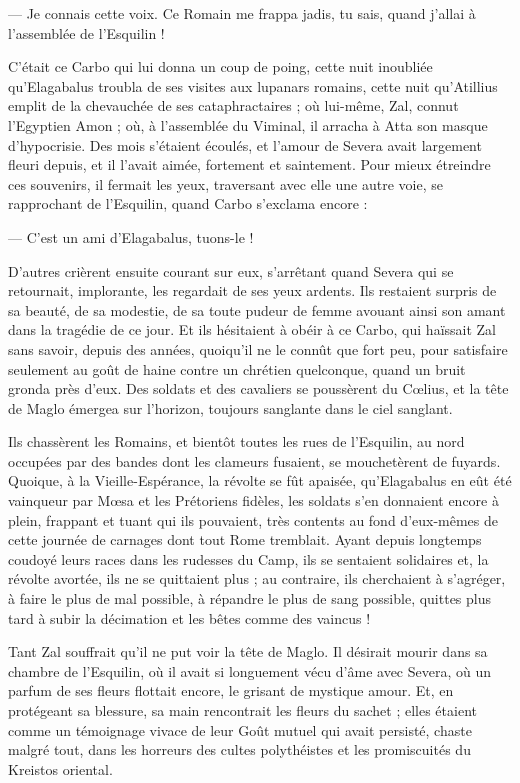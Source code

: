 \documentclass[a4paper, 11pt, oneside, polutonikogreek, french]{article}
\begin{document}
--- Je connais cette voix. Ce Romain me frappa jadis, tu sais, quand j'allai à l'assemblée de l'Esquilin !

C'était ce Carbo qui lui donna un coup de poing, cette nuit inoubliée qu'Elagabalus troubla de ses visites aux lupanars romains, cette nuit qu'Atillius emplit de la chevauchée de ses cataphractaires ; où lui-même, Zal, connut l'Egyptien Amon ; où, à l'assemblée du Viminal, il arracha à Atta son masque d'hypocrisie. Des mois s'étaient écoulés, et l'amour de Severa avait largement fleuri depuis, et il l'avait aimée, fortement et saintement. Pour mieux étreindre ces souvenirs, il fermait les yeux, traversant avec elle une autre voie, se rapprochant de l'Esquilin, quand Carbo s'exclama encore :

--- C'est un ami d'Elagabalus, tuons-le !

D'autres crièrent ensuite courant sur eux, s'arrêtant quand Severa qui se retournait, implorante, les regardait de ses yeux ardents. Ils restaient surpris de sa beauté, de sa modestie, de sa toute pudeur de femme avouant ainsi son amant dans la tragédie de ce jour. Et ils hésitaient à obéir à ce Carbo, qui haïssait Zal sans savoir, depuis des années, quoiqu'il ne le connût que fort peu, pour satisfaire seulement au goût de haine contre un chrétien quelconque, quand un bruit gronda près d'eux. Des soldats et des cavaliers se poussèrent du Cœlius, et la tête de Maglo émergea sur l'horizon, toujours sanglante dans le ciel sanglant.

Ils chassèrent les Romains, et bientôt toutes les rues de l'Esquilin, au nord occupées par des bandes dont les clameurs fusaient, se mouchetèrent de fuyards. Quoique, à la Vieille-Espérance, la révolte se fût apaisée, qu'Elagabalus en eût été vainqueur par Mœsa et les Prétoriens fidèles, les soldats s'en donnaient encore à plein, frappant et tuant qui ils pouvaient, très contents au fond d'eux-mêmes de cette journée de carnages dont tout Rome tremblait. Ayant depuis longtemps coudoyé leurs races dans les rudesses du Camp, ils se sentaient solidaires et, la révolte avortée, ils ne se quittaient plus ; au contraire, ils cherchaient à s'agréger, à faire le plus de mal possible, à répandre le plus de sang possible, quittes plus tard à subir la décimation et les bêtes comme des vaincus !

Tant Zal souffrait qu'il ne put voir la tête de Maglo. Il désirait mourir dans sa chambre de l'Esquilin, où il avait si longuement vécu d'âme avec Severa, où un parfum de ses fleurs flottait encore, le grisant de mystique amour. Et, en protégeant sa blessure, sa main rencontrait les fleurs du sachet ; elles étaient comme un témoignage vivace de leur Goût mutuel qui avait persisté, chaste malgré tout, dans les horreurs des cultes polythéistes et les promiscuités du Kreistos oriental.
\end{document}

